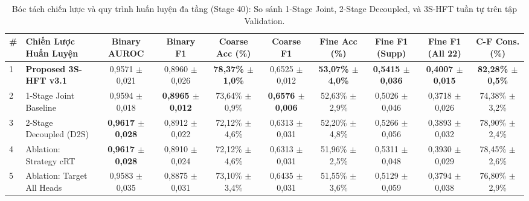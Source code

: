 \begin{table}[t]
\centering
\small
\caption{Bóc tách chiến lược và quy trình huấn luyện đa tầng (Stage 40): So sánh 1-Stage Joint, 2-Stage Decoupled, và 3S-HFT tuần tự trên tập Validation.}
\label{tab:ablation_training_paradigm}
\begin{adjustbox}{width=\textwidth}
\begin{tabular}{llcccccccc}
\toprule
\textbf{\#} & \textbf{Chiến Lược Huấn Luyện} & \textbf{Binary AUROC} & \textbf{Binary F1} & \textbf{Coarse Acc (\%)} & \textbf{Coarse F1} & \textbf{Fine Acc (\%)} & \textbf{Fine F1 (Supp)} & \textbf{Fine F1 (All 22)} & \textbf{C-F Cons. (\%)} \\
\midrule
1 & \textbf{Proposed 3S-HFT v3.1} & 0,9571 $\pm$ 0,021 & 0,8960 $\pm$ 0,026 & \textbf{78,37\% $\pm$ 1,0\%} & 0,6525 $\pm$ 0,012 & \textbf{53,07\% $\pm$ 4,0\%} & \textbf{0,5415 $\pm$ 0,036} & \textbf{0,4007 $\pm$ 0,015} & \textbf{82,28\% $\pm$ 0,5\%} \\
2 & 1-Stage Joint Baseline & 0,9594 $\pm$ 0,018 & \textbf{0,8965 $\pm$ 0,012} & 73,64\% $\pm$ 0,9\% & \textbf{0,6576 $\pm$ 0,006} & 52,63\% $\pm$ 2,9\% & 0,5026 $\pm$ 0,046 & 0,3718 $\pm$ 0,026 & 74,38\% $\pm$ 3,2\% \\
3 & 2-Stage Decoupled (D2S) & \textbf{0,9617 $\pm$ 0,028} & 0,8912 $\pm$ 0,022 & 72,12\% $\pm$ 4,6\% & 0,6313 $\pm$ 0,031 & 52,20\% $\pm$ 4,8\% & 0,5266 $\pm$ 0,056 & 0,3893 $\pm$ 0,032 & 78,90\% $\pm$ 2,4\% \\
4 & Ablation: Strategy cRT & \textbf{0,9617 $\pm$ 0,028} & 0,8910 $\pm$ 0,024 & 72,12\% $\pm$ 4,6\% & 0,6313 $\pm$ 0,031 & 51,96\% $\pm$ 2,5\% & 0,5311 $\pm$ 0,048 & 0,3930 $\pm$ 0,029 & 78,45\% $\pm$ 2,6\% \\
5 & Ablation: Target All Heads & 0,9583 $\pm$ 0,035 & 0,8875 $\pm$ 0,031 & 73,10\% $\pm$ 3,4\% & 0,6435 $\pm$ 0,031 & 51,55\% $\pm$ 3,6\% & 0,5129 $\pm$ 0,059 & 0,3794 $\pm$ 0,038 & 76,80\% $\pm$ 2,9\% \\
\bottomrule
\end{tabular}
\end{adjustbox}
\end{table}
